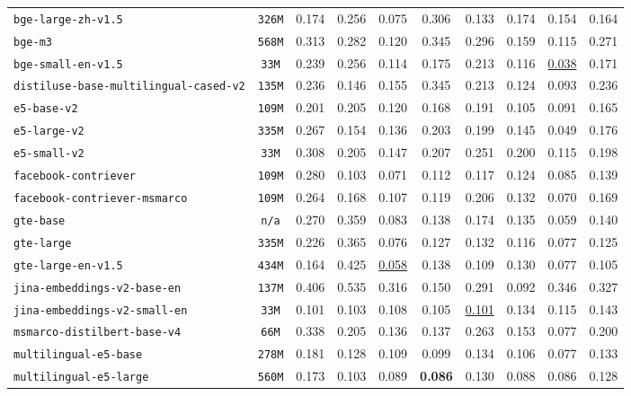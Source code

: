 \documentclass[11pt]{article}
\begin{document}
\begin{table}[htbp]
{\begin{tabular}{lccccccccc}
\texttt{bge-large-zh-v1.5} & \texttt{326M} & 0.174 & 0.256 & 0.075 & 0.306 & 0.133 & 0.174 & 0.154 & 0.164 \\
\texttt{bge-m3} & \texttt{568M} & 0.313 & 0.282 & 0.120 & 0.345 & 0.296 & 0.159 & 0.115 & 0.271 \\
\texttt{bge-small-en-v1.5} & \texttt{33M} & 0.239 & 0.256 & 0.114 & 0.175 & 0.213 & 0.116 & \underline{0.038} & 0.171 \\
\texttt{distiluse-base-multilingual-cased-v2} & \texttt{135M} & 0.236 & 0.146 & 0.155 & 0.345 & 0.213 & 0.124 & 0.093 & 0.236 \\
\texttt{e5-base-v2} & \texttt{109M} & 0.201 & 0.205 & 0.120 & 0.168 & 0.191 & 0.105 & 0.091 & 0.165 \\
\texttt{e5-large-v2} & \texttt{335M} & 0.267 & 0.154 & 0.136 & 0.203 & 0.199 & 0.145 & 0.049 & 0.176 \\
\texttt{e5-small-v2} & \texttt{33M} & 0.308 & 0.205 & 0.147 & 0.207 & 0.251 & 0.200 & 0.115 & 0.198 \\
\texttt{facebook-contriever} & \texttt{109M} & 0.280 & 0.103 & 0.071 & 0.112 & 0.117 & 0.124 & 0.085 & 0.139 \\
\texttt{facebook-contriever-msmarco} & \texttt{109M} & 0.264 & 0.168 & 0.107 & 0.119 & 0.206 & 0.132 & 0.070 & 0.169 \\
\texttt{gte-base} & \texttt{n/a} & 0.270 & 0.359 & 0.083 & 0.138 & 0.174 & 0.135 & 0.059 & 0.140 \\
\texttt{gte-large} & \texttt{335M} & 0.226 & 0.365 & 0.076 & 0.127 & 0.132 & 0.116 & 0.077 & 0.125 \\
\texttt{gte-large-en-v1.5} & \texttt{434M} & 0.164 & 0.425 & \underline{0.058} & 0.138 & 0.109 & 0.130 & 0.077 & 0.105 \\
\texttt{jina-embeddings-v2-base-en} & \texttt{137M} & 0.406 & 0.535 & 0.316 & 0.150 & 0.291 & 0.092 & 0.346 & 0.327 \\
\texttt{jina-embeddings-v2-small-en} & \texttt{33M} & 0.101 & 0.103 & 0.108 & 0.105 & \underline{0.101} & 0.134 & 0.115 & 0.143 \\
\texttt{msmarco-distilbert-base-v4} & \texttt{66M} & 0.338 & 0.205 & 0.136 & 0.137 & 0.263 & 0.153 & 0.077 & 0.200 \\
\texttt{multilingual-e5-base} & \texttt{278M} & 0.181 & 0.128 & 0.109 & 0.099 & 0.134 & 0.106 & 0.077 & 0.133 \\
\texttt{multilingual-e5-large} & \texttt{560M} & 0.173 & 0.103 & 0.089 & \textbf{0.086} & 0.130 & 0.088 & 0.086 & 0.128 \\

\end{tabular}}
\end{table}
\end{document}
